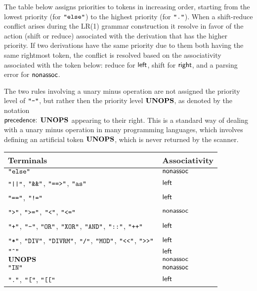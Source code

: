 The table below assigns priorities to tokens in increasing order, starting from the lowest priority (for $\Telse$)
to the highest priority (for $\Tdot$).
When a shift-reduce conflict arises during the LR(1) grammar construction
it resolve in favor of the action (shift or reduce) associated with the derivation that has the higher priority.
If two derivations have the same priority due to them both having the same rightmost token,
the conflict is resolved based on the associativity associated with the token below:
reduce for $\leftassoc$, shift for $\rightassoc$, and a parsing error for $\nonassoc$.

The two rules involving a unary minus operation are not assigned the priority level of $\Tminus$,
but rather then the priority level $\Tunops$, as denoted by the notation \\
$\precedence{\Tunops}$
appearing to their right. This is a standard way of dealing with a unary minus operation
in many programming languages, which involves defining an artificial token $\Tunops$,
which is never returned by the scanner.

\begin{center}
\begin{tabular}{ll}
\textbf{Terminals} & \textbf{Associativity}\\
\hline
$\Telse$ & $\nonassoc$\\
$\Tbor$, $\Tband$, $\Timpl$, $\Tas$ & $\leftassoc$\\
$\Teqop$, $\Tneq$ & $\leftassoc$\\
$\Tgt$, $\Tgeq$, $\Tlt$, $\Tleq$ & $\nonassoc$\\
$\Tplus$, $\Tminus$, $\Tor$, $\Txor$, $\Tand$, $\Tcoloncolon$, $\Tplusplus$ & $\leftassoc$\\
$\Tmul$, $\Tdiv$, $\Tdivrm$, $\Trdiv$, $\Tmod$, $\Tshl$, $\Tshr$ & $\leftassoc$\\
$\Tpow$ & $\leftassoc$\\
$\Tunops$ & $\nonassoc$\\
$\Tin$ & $\nonassoc$\\
$\Tdot$, $\Tlbracket$, $\Tllbracket$ & $\leftassoc$
\end{tabular}
\end{center}
